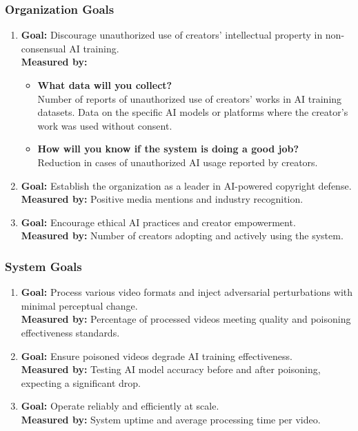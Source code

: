 \subsubsection{Organization Goals}
\begin{enumerate}
    \item 
    \textbf{Goal:}
    Discourage unauthorized use of creators' intellectual property in non-consensual AI training. \\
    \textbf{Measured by:} 
    \begin{itemize}
        \item 
        \textbf{What data will you collect?} \\
        Number of reports of unauthorized use of creators' works in AI training datasets.
        Data on the specific AI models or platforms where the creator's work was used without consent.
        \item 
        \textbf{How will you know if the system is doing a good job?} \\
            Reduction in cases of unauthorized AI usage reported by creators.
    \end{itemize}
    
    \item 
    \textbf{Goal:}
    Establish the organization as a leader in AI-powered copyright defense. \\
    \textbf{Measured by:} 
    Positive media mentions and industry recognition.
    
    \item 
    \textbf{Goal:}
    Encourage ethical AI practices and creator empowerment. \\
    \textbf{Measured by:} 
    Number of creators adopting and actively using the system.
\end{enumerate}

\subsubsection{System Goals}
\begin{enumerate}
    \item 
    \textbf{Goal:}
    Process various video formats and inject adversarial perturbations with minimal perceptual change. \\
    \textbf{Measured by:} 
    Percentage of processed videos meeting quality and poisoning effectiveness standards.
    
    \item 
    \textbf{Goal:}
    Ensure poisoned videos degrade AI training effectiveness. \\
    \textbf{Measured by:} 
    Testing AI model accuracy before and after poisoning, expecting a significant drop.
    
    \item 
    \textbf{Goal:}
    Operate reliably and efficiently at scale. \\
    \textbf{Measured by:} 
    System uptime and average processing time per video.
\end{enumerate}


